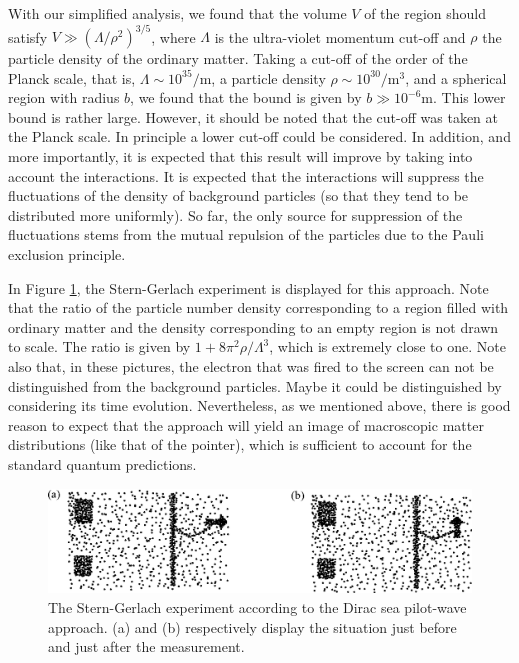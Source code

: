 \documentclass[11pt]{article}
\begin{document}
With our simplified analysis, we found that the volume $V$ of the region should satisfy $V \gg (\Lambda / \rho^2)^{3/5}$, where $\Lambda$ is the ultra-violet momentum cut-off and $\rho$ the particle density of the ordinary matter. Taking a cut-off of the order of the Planck scale, that is, $\Lambda \sim 10^{35}/$m, a particle density $\rho \sim 10^{30}/$m$^3$, and a spherical region with radius $b$, we found that the bound is given by $b \gg 10^{-6}$m. This lower bound is rather large. However, it should be noted that the cut-off was taken at the Planck scale. In principle a lower cut-off could be considered. In addition, and more importantly, it is expected that this result will improve by taking into account the interactions. It is expected that the interactions will suppress the fluctuations of the density of background particles (so that they tend to be distributed more uniformly). So far, the only source for suppression of the fluctuations stems from the mutual repulsion of the particles due to the Pauli exclusion principle.

In Figure \ref{diracsea}, the Stern-Gerlach experiment is displayed for this approach. Note that the ratio of the particle number density corresponding to a region filled with ordinary matter and the density corresponding to an empty region is not drawn to scale. The ratio is given by $1+8\pi^2 \rho/ \Lambda^3$, which is extremely close to one. Note also that, in these pictures, the electron that was fired to the screen can not be distinguished from the background particles. Maybe it could be distinguished by considering its time evolution. Nevertheless, as we mentioned above, there is good reason to expect that the approach will yield an image of macroscopic matter distributions (like that of the pointer), which is sufficient to account for the standard quantum predictions. 

\begin{figure}
\begin{center}
\includegraphics{diracsea.eps}
\end{center}
\caption{\label{diracsea}The Stern-Gerlach experiment according to the Dirac sea pilot-wave approach. (a) and (b) respectively display the situation just before and just after the measurement.}
\end{figure}
\end{document}
